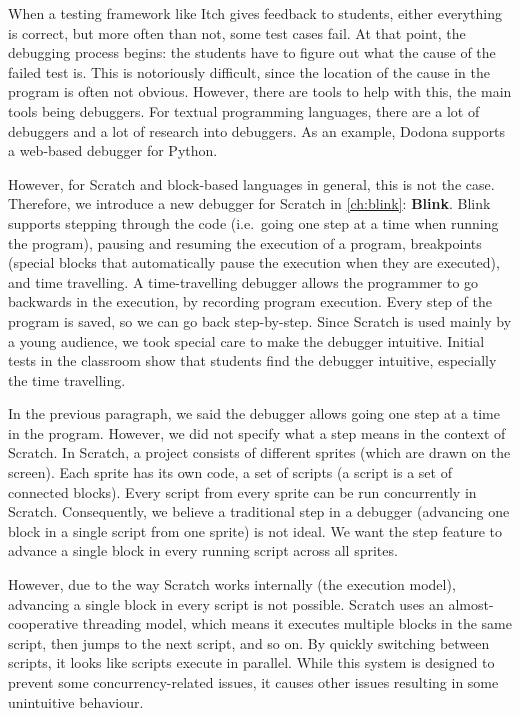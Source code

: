 \documentclass[main]{subfiles}
\begin{document}
When a testing framework like Itch gives feedback to students, either everything is correct, but more often than not, some test cases fail.
At that point, the debugging process begins: the students have to figure out what the cause of the failed test is.
This is notoriously difficult, since the location of the cause in the program is often not obvious.
However, there are tools to help with this, the main tools being debuggers.
For textual programming languages, there are a lot of debuggers and a lot of research into debuggers.
As an example, Dodona supports a web-based debugger for Python.

However, for Scratch and block-based languages in general, this is not the case.
Therefore, we introduce a new debugger for Scratch in \cref{ch:blink}: \textbf{Blink}.
Blink supports stepping through the code (i.e.\ going one step at a time when running the program), pausing and resuming the execution of a program, breakpoints (special blocks that automatically pause the execution when they are executed), and time travelling.
A time-travelling debugger allows the programmer to go backwards in the execution, by recording program execution.
Every step of the program is saved, so we can go back step-by-step.
Since Scratch is used mainly by a young audience, we took special care to make the debugger intuitive.
Initial tests in the classroom show that students find the debugger intuitive, especially the time travelling.

In the previous paragraph, we said the debugger allows going one step at a time in the program.
However, we did not specify what a step means in the context of Scratch.
In Scratch, a project consists of different sprites (which are drawn on the screen).
Each sprite has its own code, a set of scripts (a script is a set of connected blocks).
Every script from every sprite can be run concurrently in Scratch.
Consequently, we believe a traditional step in a debugger (advancing one block in a single script from one sprite) is not ideal.
We want the step feature to advance a single block in every running script across all sprites.

However, due to the way Scratch works internally (the execution model), advancing a single block in every script is not possible.
Scratch uses an almost-cooperative threading model, which means it executes multiple blocks in the same script, then jumps to the next script, and so on.
By quickly switching between scripts,
it looks like scripts execute in parallel.
While this system is designed to prevent some concurrency-related issues, it causes other issues resulting in some unintuitive behaviour.
\end{document}

